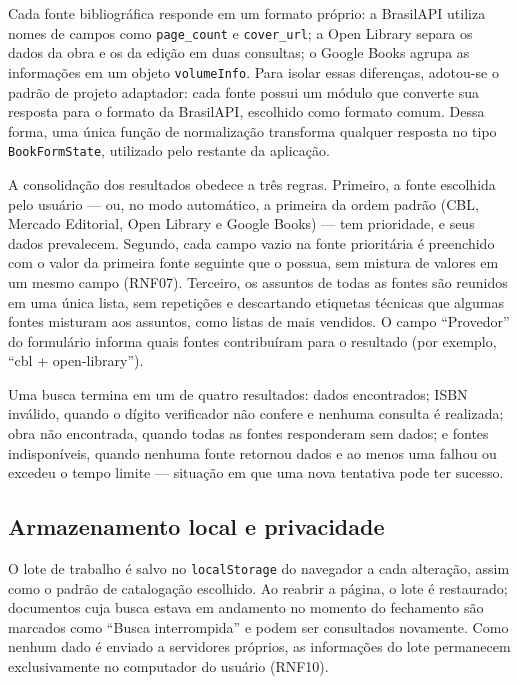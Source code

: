 Cada fonte bibliográfica responde em um formato próprio: a BrasilAPI utiliza nomes de campos como \texttt{page\_count} e \texttt{cover\_url}; a Open Library separa os dados da obra e os da edição em duas consultas; o Google Books agrupa as informações em um objeto \texttt{volumeInfo}. Para isolar essas diferenças, adotou-se o padrão de projeto adaptador: cada fonte possui um módulo que converte sua resposta para o formato da BrasilAPI, escolhido como formato comum. Dessa forma, uma única função de normalização transforma qualquer resposta no tipo \texttt{BookFormState}, utilizado pelo restante da aplicação.

A consolidação dos resultados obedece a três regras. Primeiro, a fonte escolhida pelo usuário --- ou, no modo automático, a primeira da ordem padrão (CBL, Mercado Editorial, Open Library e Google Books) --- tem prioridade, e seus dados prevalecem. Segundo, cada campo vazio na fonte prioritária é preenchido com o valor da primeira fonte seguinte que o possua, sem mistura de valores em um mesmo campo (RNF07). Terceiro, os assuntos de todas as fontes são reunidos em uma única lista, sem repetições e descartando etiquetas técnicas que algumas fontes misturam aos assuntos, como listas de mais vendidos. O campo ``Provedor'' do formulário informa quais fontes contribuíram para o resultado (por exemplo, ``cbl + open-library'').

Uma busca termina em um de quatro resultados: dados encontrados; ISBN inválido, quando o dígito verificador não confere e nenhuma consulta é realizada; obra não encontrada, quando todas as fontes responderam sem dados; e fontes indisponíveis, quando nenhuma fonte retornou dados e ao menos uma falhou ou excedeu o tempo limite --- situação em que uma nova tentativa pode ter sucesso.

\subsection{Armazenamento local e privacidade}
\label{subsec:arq-armazenamento}

O lote de trabalho é salvo no \texttt{localStorage} do navegador a cada alteração, assim como o padrão de catalogação escolhido. Ao reabrir a página, o lote é restaurado; documentos cuja busca estava em andamento no momento do fechamento são marcados como ``Busca interrompida'' e podem ser consultados novamente. Como nenhum dado é enviado a servidores próprios, as informações do lote permanecem exclusivamente no computador do usuário (RNF10).

